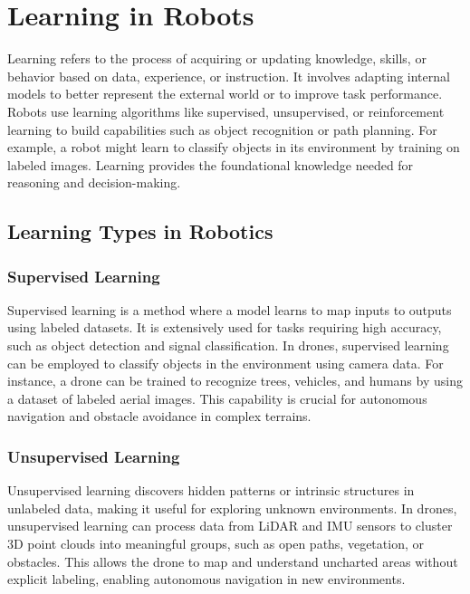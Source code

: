 \chapter{Learning in Robots}
Learning refers to the process of acquiring or updating knowledge, skills, or behavior based on data, experience, or instruction. It involves adapting internal models to better represent the external world or to improve task performance. Robots use learning algorithms like supervised, unsupervised, or reinforcement learning to build capabilities such as object recognition or path planning. For example, a robot might learn to classify objects in its environment by training on labeled images. Learning provides the foundational knowledge needed for reasoning and decision-making. \cite{lecun-2015-deep-learning}

\section{Learning Types in Robotics}

\subsection{Supervised Learning}
Supervised learning is a method where a model learns to map inputs to outputs using labeled datasets. It is extensively used for tasks requiring high accuracy, such as object detection and signal classification. In drones, supervised learning can be employed to classify objects in the environment using camera data. For instance, a drone can be trained to recognize trees, vehicles, and humans by using a dataset of labeled aerial images. This capability is crucial for autonomous navigation and obstacle avoidance in complex terrains. \cite{lecun-2015-deep-learning}

\subsection{Unsupervised Learning}
Unsupervised learning discovers hidden patterns or intrinsic structures in unlabeled data, making it useful for exploring unknown environments. In drones, unsupervised learning can process data from LiDAR and IMU sensors to cluster 3D point clouds into meaningful groups, such as open paths, vegetation, or obstacles. This allows the drone to map and understand uncharted areas without explicit labeling, enabling autonomous navigation in new environments. \cite{hinton-1999-unsupervised-learning}

